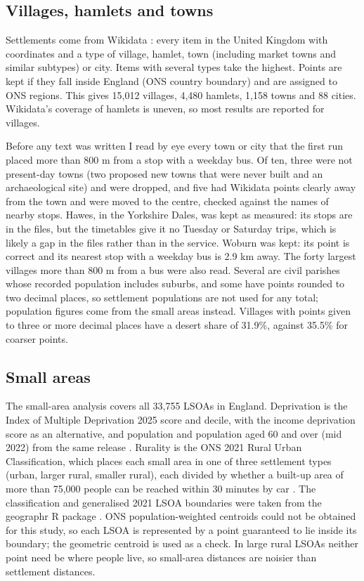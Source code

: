 \documentclass[11pt,a4paper]{article}
\begin{document}
\subsection{Villages, hamlets and towns}
Settlements come from Wikidata \citep{vrandecic2014}: every item in the United Kingdom with coordinates and a type of village, hamlet, town (including market towns and similar subtypes) or city. Items with several types take the highest. Points are kept if they fall inside England (ONS country boundary) and are assigned to ONS regions. This gives 15,012 villages, 4,480 hamlets, 1,158 towns and 88 cities. Wikidata's coverage of hamlets is uneven, so most results are reported for villages.

Before any text was written I read by eye every town or city that the first run placed more than 800 m from a stop with a weekday bus. Of ten, three were not present-day towns (two proposed new towns that were never built and an archaeological site) and were dropped, and five had Wikidata points clearly away from the town and were moved to the centre, checked against the names of nearby stops. Hawes, in the Yorkshire Dales, was kept as measured: its stops are in the files, but the timetables give it no Tuesday or Saturday trips, which is likely a gap in the files rather than in the service. Woburn was kept: its point is correct and its nearest stop with a weekday bus is 2.9 km away. The forty largest villages more than 800 m from a bus were also read. Several are civil parishes whose recorded population includes suburbs, and some have points rounded to two decimal places, so settlement populations are not used for any total; population figures come from the small areas instead. Villages with points given to three or more decimal places have a desert share of 31.9\%, against 35.5\% for coarser points.

\subsection{Small areas}
The small-area analysis covers all 33,755 LSOAs in England. Deprivation is the Index of Multiple Deprivation 2025 score and decile, with the income deprivation score as an alternative, and population and population aged 60 and over (mid 2022) from the same release \citep{iod2025}. Rurality is the ONS 2021 Rural Urban Classification, which places each small area in one of three settlement types (urban, larger rural, smaller rural), each divided by whether a built-up area of more than 75,000 people can be reached within 30 minutes by car \citep{ons2021ruc}. The classification and generalised 2021 LSOA boundaries were taken from the geographr R package \citep{geographr}. ONS population-weighted centroids could not be obtained for this study, so each LSOA is represented by a point guaranteed to lie inside its boundary; the geometric centroid is used as a check. In large rural LSOAs neither point need be where people live, so small-area distances are noisier than settlement distances.
\end{document}
